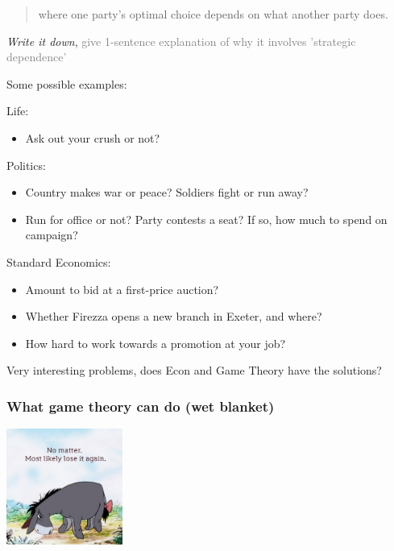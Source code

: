 \documentclass[]{article}
\providecommand{\tightlist}{%
  \setlength{\itemsep}{0pt}\setlength{\parskip}{0pt}}
\begin{document}
\begin{quote}
where one party's optimal choice depends on what another party does.
\end{quote}

\emph{Write it down},
\textcolor{gray}{give 1-sentence explanation of why it involves 'strategic dependence'}

Some possible examples:

Life:

\begin{itemize}
\tightlist
\item
  Ask out your crush or not?
\end{itemize}

\bigskip

Politics:

\begin{itemize}
\item
  Country makes war or peace? Soldiers fight or run away?
\item
  Run for office or not? Party contests a seat? If so, how much to spend
  on campaign?
\end{itemize}

\bigskip

Standard Economics:

\begin{itemize}
\item
  Amount to bid at a first-price auction?
\item
  Whether Firezza opens a new branch in Exeter, and where?
\item
  How hard to work towards a promotion at your job?
\end{itemize}

Very interesting problems, does Econ and Game Theory have the solutions?

\hypertarget{what-game-theory-can-do-wet-blanket}{%
\subsubsection{What game theory can do (wet
blanket)}\label{what-game-theory-can-do-wet-blanket}}

\includegraphics[height=1.5in]{picsfigs/Eeyore_Pink.jpg}
\end{document}
